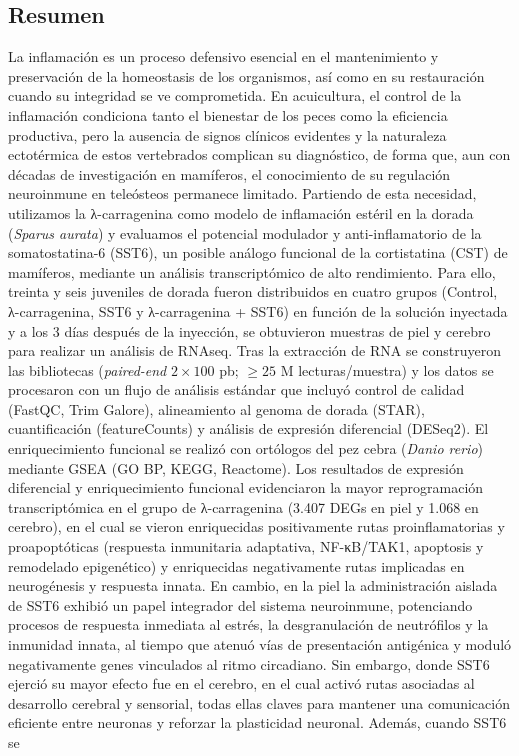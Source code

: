 \documentclass[10pt,a4paper]{article}
\begin{document}
\newpage

\begin{center}
\section*{Resumen}
\end{center}

La inflamación es un proceso defensivo esencial en el mantenimiento y preservación de la homeostasis de los organismos, así como en su restauración cuando su integridad se ve comprometida. En acuicultura, el control de la inflamación condiciona tanto el bienestar de los peces como la eficiencia productiva, pero la ausencia de signos clínicos evidentes y la naturaleza ectotérmica de estos vertebrados complican su diagnóstico, de forma que, aun con décadas de investigación en mamíferos, el conocimiento de su regulación neuroinmune en teleósteos permanece limitado. Partiendo de esta necesidad, utilizamos la λ-carragenina como modelo de inflamación estéril en la dorada (\textit{Sparus aurata}) y evaluamos el potencial modulador y anti-inflamatorio de la somatostatina-6 (SST6), un posible análogo funcional de la cortistatina (CST) de mamíferos, mediante un análisis transcriptómico de alto rendimiento. Para ello, treinta y seis juveniles de dorada fueron distribuidos en cuatro grupos (Control, λ-carragenina, SST6 y λ-carragenina + SST6) en función de la solución inyectada y a los 3 días después de la inyección, se obtuvieron muestras de piel y cerebro para realizar un análisis de RNAseq. Tras la extracción de RNA se construyeron las bibliotecas (\textit{paired-end} $2 \times 100$ pb; $\ge 25$ M lecturas/muestra) y los datos se procesaron con un flujo de análisis estándar que incluyó control de calidad (FastQC, Trim Galore), alineamiento al genoma de dorada (STAR), cuantificación (featureCounts) y análisis de expresión diferencial (DESeq2). El enriquecimiento funcional se realizó con ortólogos del pez cebra (\textit{Danio rerio}) mediante GSEA (GO BP, KEGG, Reactome). Los resultados de expresión diferencial y enriquecimiento funcional evidenciaron la mayor reprogramación transcriptómica en el grupo de λ-carragenina (3.407 DEGs en piel y 1.068 en cerebro), en el cual se vieron enriquecidas positivamente rutas proinflamatorias y proapoptóticas (respuesta inmunitaria adaptativa, NF-κB/TAK1, apoptosis y remodelado epigenético) y enriquecidas negativamente rutas implicadas en neurogénesis y respuesta innata. En cambio, en la piel la administración aislada de SST6 exhibió un papel integrador del sistema neuroinmune, potenciando procesos de respuesta inmediata al estrés, la desgranulación de neutrófilos y la inmunidad innata, al tiempo que atenuó vías de presentación antigénica y moduló negativamente genes vinculados al ritmo circadiano. Sin embargo, donde SST6 ejerció su mayor efecto fue en el cerebro, en el cual activó rutas asociadas al desarrollo cerebral y sensorial, todas ellas claves para mantener una comunicación eficiente entre neuronas y reforzar la plasticidad neuronal. Además, cuando SST6 se 
\end{document}
